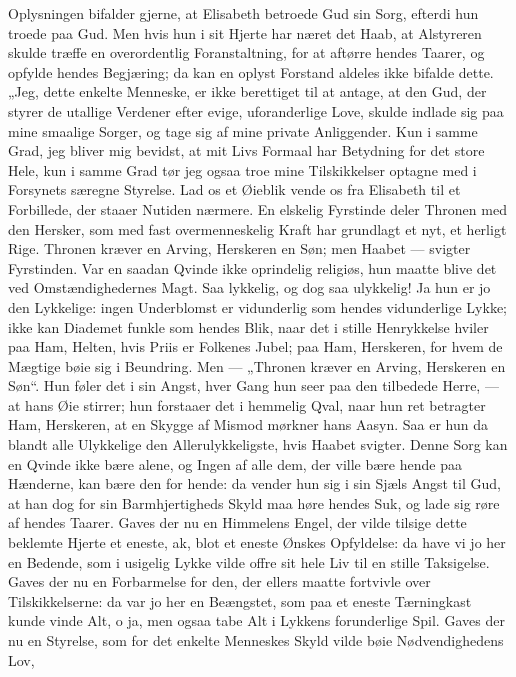\documentclass[12pt,a4paper]{book}
\begin{document}
Oplysningen bifalder gjerne, at Elisabeth betroede Gud sin Sorg,
efterdi hun troede paa Gud. Men hvis hun i sit Hjerte har næret det
Haab, at Alstyreren skulde træffe en overordentlig Foranstaltning, for
at aftørre hendes Taarer, og opfylde hendes Begjæring; da kan en oplyst
Forstand aldeles ikke bifalde dette. „Jeg, dette enkelte Menneske, er
ikke berettiget til at antage, at den Gud, der styrer de utallige
Verdener efter evige, uforanderlige Love, skulde indlade sig paa mine
smaalige Sorger, og tage sig af mine private Anliggender. Kun i samme
Grad, jeg bliver mig bevidst, at mit Livs Formaal har Betydning for det
store Hele, kun i samme Grad tør jeg ogsaa troe mine Tilskikkelser
optagne med i Forsynets særegne Styrelse. Lad os et Øieblik vende os
fra Elisabeth til et Forbillede, der staaer Nutiden nærmere. En
elskelig Fyrstinde deler Thronen med den Hersker, som med fast
overmenneskelig Kraft har grundlagt et nyt, et herligt Rige. Thronen
kræver en Arving, Herskeren en Søn; men Haabet --- svigter Fyrstinden.
Var en saadan Qvinde ikke oprindelig religiøs, hun maatte blive det ved
Omstændighedernes Magt. Saa lykkelig,
og dog saa ulykkelig! Ja hun er jo den Lykkelige: ingen Underblomst er
vidunderlig som hendes vidunderlige Lykke; ikke kan Diademet funkle som
hendes Blik, naar det i stille Henrykkelse hviler paa Ham, Helten, hvis
Priis er Folkenes Jubel; paa Ham, Herskeren, for hvem de Mægtige bøie
sig i Beundring. Men --- „Thronen kræver en Arving, Herskeren en Søn“.
Hun føler det i sin Angst, hver Gang hun seer paa den tilbedede Herre,
--- at hans Øie stirrer; hun forstaaer det i hemmelig Qval, naar hun
ret betragter Ham, Herskeren, at en Skygge af Mismod mørkner hans
Aasyn. Saa er hun da blandt alle Ulykkelige den Allerulykkeligste, hvis
Haabet svigter. Denne Sorg kan en Qvinde ikke bære alene, og Ingen af
alle dem, der ville bære hende paa Hænderne, kan bære den for hende: da
vender hun sig i sin Sjæls Angst til Gud, at han dog for sin
Barmhjertigheds Skyld maa høre hendes Suk, og lade sig røre af hendes
Taarer. Gaves der nu en Himmelens Engel, der vilde tilsige dette
beklemte Hjerte et eneste, ak, blot et eneste Ønskes Opfyldelse: da
have vi jo her en Bedende, som i usigelig Lykke vilde offre sit hele
Liv til en stille Taksigelse. Gaves der nu en Forbarmelse for den, der
ellers maatte fortvivle over Tilskikkelserne: da var jo her en
Beængstet, som paa et eneste Tærningkast kunde vinde Alt, o ja, men
ogsaa tabe Alt i Lykkens forunderlige Spil. Gaves der nu en Styrelse,
som for det enkelte Menneskes Skyld vilde bøie Nødvendighedens Lov,
\end{document}
